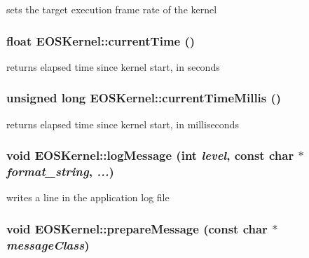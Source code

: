 sets the target execution frame rate of the kernel 

\hypertarget{structEOSKernel_68610ced573efe86f7db3ca176590793}{
\subsubsection[{currentTime}]{\setlength{\rightskip}{0pt plus 5cm}float EOSKernel::currentTime ()}}
\label{structEOSKernel_68610ced573efe86f7db3ca176590793}


returns elapsed time since kernel start, in seconds 

\hypertarget{structEOSKernel_2b1e8769e99c2af88e199534c1cc694b}{
\subsubsection[{currentTimeMillis}]{\setlength{\rightskip}{0pt plus 5cm}unsigned long EOSKernel::currentTimeMillis ()}}
\label{structEOSKernel_2b1e8769e99c2af88e199534c1cc694b}


returns elapsed time since kernel start, in milliseconds 

\hypertarget{structEOSKernel_3901b7994589931f6d409a3a7f42dae2}{
\subsubsection[{logMessage}]{\setlength{\rightskip}{0pt plus 5cm}void EOSKernel::logMessage (int {\em level}, \/  const char $\ast$ {\em format\_\-string}, \/   {\em ...})}}
\label{structEOSKernel_3901b7994589931f6d409a3a7f42dae2}


writes a line in the application log file 

\hypertarget{structEOSKernel_5a647f0ff07643959bebac4408d6c105}{
\subsubsection[{prepareMessage}]{\setlength{\rightskip}{0pt plus 5cm}void EOSKernel::prepareMessage (const char $\ast$ {\em messageClass})}}
\label{structEOSKernel_5a647f0ff07643959bebac4408d6c105}


